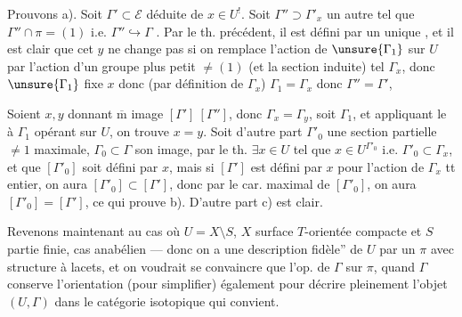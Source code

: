 
Prouvons a). Soit \(\Gamma'\subset\mathcal E\)
déduite de \(x\in U^!\).
Soit \(\Gamma''\supset\Gamma'_x\) un autre 
tel que \(\Gamma''\cap\pi=(1)\) i.e. \(\Gamma''\hookrightarrow\Gamma\)
.
Par le th. précédent, il est défini par un unique
,
et il est clair que cet \(y\) ne change pas si on remplace l'action de
\(\unsure{\Gamma_1}\) sur \(U\) par l'action d'un groupe plus petit
\(\ne(1)\) (et la section induite) tel \(\Gamma_x\),
donc \(\unsure{\Gamma_1}\)  fixe \(x\) donc
(par définition de \(\Gamma_x\)) \(\Gamma_1=\Gamma_x\) donc
\(\Gamma''=\Gamma'\), 

Soient \(x,y\) donnant \(\overline{\mathrm m}\) image
\([\Gamma']\ [\Gamma'']\), donc \(\Gamma_x=\Gamma_y\), soit \(\Gamma_1\),
et appliquant le  à \(\Gamma_1\) opérant sur \(U\),
on trouve \(x=y\).
Soit d'autre part \(\Gamma'_0\) une section partielle \(\ne1\) maximale,
\(\Gamma_0\subset\Gamma\) son image,
par le th. 
\(\exists x\in U\)  tel que
\(x\in U^{\Gamma'_0}\) i.e. \(\Gamma'_0\subset\Gamma_x\),
et que \([\Gamma'_0]\) soit défini par \(x\),
mais si \([\Gamma']\) est défini par \(x\) pour l'action de
\(\Gamma_x\) tt entier, on aura \([\Gamma'_0]\subset[\Gamma']\),
donc par le car. maximal de \([\Gamma'_0]\), on aura
\([\Gamma'_0]=[\Gamma']\), ce  qui prouve b).
D'autre part c) est clair.



Revenons maintenant au cas où \(U=X\setminus S\), \(X\) surface
\(T\)-orientée compacte et \(S\) partie
finie, cas anabélien --- donc on a une description
 fidèle'' de \(U\) par un \(\pi\) avec
structure à lacets, et on voudrait se convaincre
que  l'op.  de \(\Gamma\)
sur \(\pi\), quand \(\Gamma\) conserve l'orientation (pour simplifier)
également  pour décrire pleinement l'objet
\((U,\Gamma)\) dans le catégorie isotopique qui convient.

